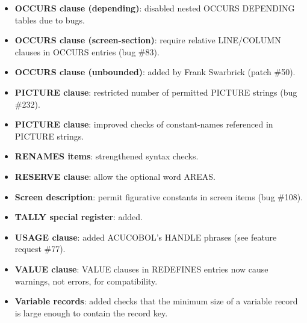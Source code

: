\begin{itemize}
\item \textbf{OCCURS clause (depending)}: disabled nested OCCURS DEPENDING tables due to bugs.
\item \textbf{OCCURS clause (screen-section)}: require relative LINE\slash{}COLUMN clauses in OCCURS entries (bug \#83).
\item \textbf{OCCURS clause (unbounded)}: added by Frank Swarbrick (patch \#50).
\item \textbf{PICTURE clause}: restricted number of permitted PICTURE strings (bug \#232).
\item \textbf{PICTURE clause}: improved checks of constant-names referenced in PICTURE strings.
\item \textbf{RENAMES items}: strengthened syntax checks.
\item \textbf{RESERVE clause}: allow the optional word AREAS.
\item \textbf{Screen description}: permit figurative constants in screen items (bug \#108).
\item \textbf{TALLY special register}: added.
\item \textbf{USAGE clause}: added ACUCOBOL's HANDLE phrases (see feature request \#77).
\item \textbf{VALUE clause}: VALUE clauses in REDEFINES entries now cause warnings, not errors, for compatibility.
\item \textbf{Variable records}: added checks that the minimum size of a variable record is large enough to contain the record key.
\end{itemize}

